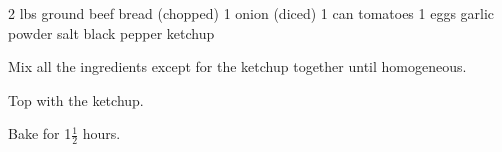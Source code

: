 \dishtype{}
\begin{ingreds}
    2 lbs ground beef
    bread (chopped)
    1 onion (diced)
    1 can tomatoes
    1 eggs
    garlic powder
    salt
    black pepper
    ketchup
\end{ingreds}
\begin{method}
    Mix all the ingredients except for the ketchup together until homogeneous.\par
    Top with the ketchup.\par
    Bake for 1$\frac{1}{2}$ hours.
\end{method}